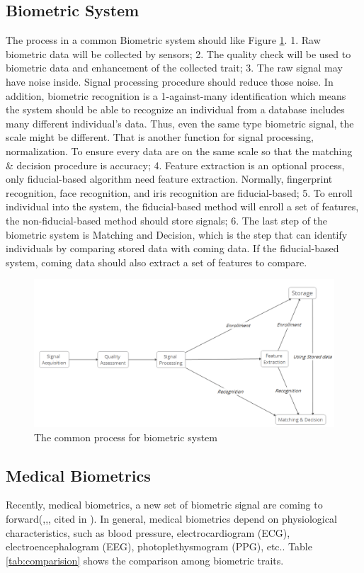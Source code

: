 \documentclass[a4paper,12pt]{article}
\begin{document}
\subsection{Biometric System}
The process in a common Biometric system should like Figure \ref{fig:common_process}. 1. Raw biometric data will be collected by sensors; 2. The quality check will be used to biometric data and enhancement of the collected trait\parencite{Pinto:2018evolution}; 3. The raw signal may have noise inside. Signal processing procedure should reduce those noise. In addition, biometric recognition is a 1-against-many identification which means the system should be able to recognize an individual from a database includes many different individual's data. Thus, even the same type biometric signal, the scale might be different. That is another function for signal processing, normalization. To ensure every data are on the same scale so that the matching \& decision procedure is accuracy; 4. Feature extraction is an optional process, only fiducial-based algorithm need feature extraction. Normally, fingerprint recognition, face recognition, and iris recognition are fiducial-based\parencite{Jain:2011bio}; 5. To enroll individual into the system, the fiducial-based method will enroll a set of features, the non-fiducial-based method should store signals; 6. The last step of the biometric system is Matching and Decision, which is the step that can identify individuals by comparing stored data with coming data. If the fiducial-based system, coming data should also extract a set of features to compare.

\begin{figure}[htbp]
\centering
\includegraphics[width = .8\textwidth]{common_bio_process.png}
\caption{The common process for biometric system}
\label{fig:common_process}
\end{figure}

\subsection{Medical Biometrics}
Recently, medical biometrics, a new set of biometric signal are coming to forward(\parencite{Abo:2014biometric},\parencite{Agrafioti:2012secure},\parencite{Akhter:2016heart}, cited in \parencite{Pinto:2018evolution}). In general, medical biometrics depend on physiological characteristics, such as blood pressure, electrocardiogram (ECG), electroencephalogram (EEG), photoplethysmogram (PPG), etc.\parencite{Agrafioti:2011medical}. Table \ref{tab:comparision} shows the comparison among biometric traits.
\end{document}
